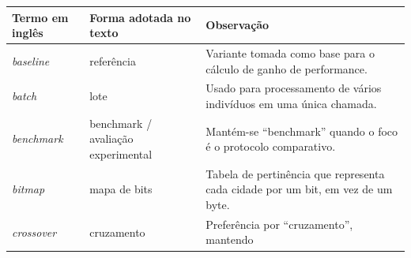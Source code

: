 \begin{longtable}[]{@{}
    >{\raggedright\arraybackslash}p{}
    >{\raggedright\arraybackslash}p{}
    >{\raggedright\arraybackslash}p{}@{}}
  \toprule\noalign{}
  \begin{minipage}[b]{\linewidth}\raggedright
    Termo em inglês
  \end{minipage} & \begin{minipage}[b]{\linewidth}\raggedright
                     Forma adotada no texto
                   \end{minipage}                   & \begin{minipage}[b]{\linewidth}\raggedright
                                                        Observação
                                                      \end{minipage}                                                                 \\
  \midrule\noalign{}
  \endhead
  \bottomrule\noalign{}
  \endlastfoot
  \emph{baseline}                             & referência                                                    & Variante tomada como base para o cálculo de ganho de performance.                                                                                                \\
  \emph{batch}                                & lote                                                          & Usado para processamento de vários indivíduos em
  uma única chamada.                                                                                                                                             \\
  \emph{benchmark}                            & benchmark / avaliação experimental                            & Mantém-se
  ``benchmark'' quando o foco é o protocolo comparativo.                                                                                                         \\
  \emph{bitmap}                               & mapa de bits                                                  & Tabela de pertinência que representa cada cidade por um
  bit, em vez de um byte.                                                                                                                                        \\
  \emph{crossover}                            & cruzamento                                                    & Preferência por ``cruzamento'', mantendo

\end{longtable}

